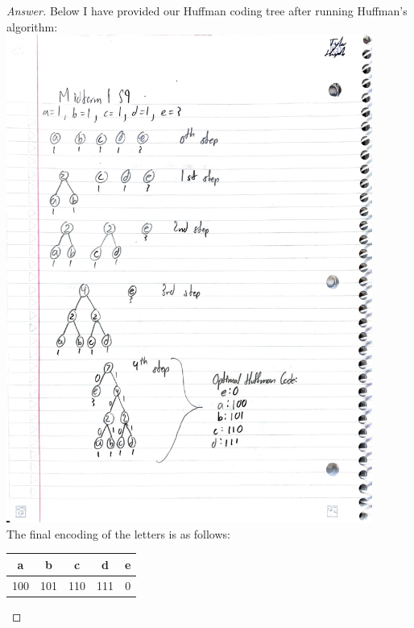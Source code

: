\documentclass[11pt]{article}
\theoremstyle{definition}
\theoremstyle{definition}
\theoremstyle{definition}
\begin{document}
\begin{proof}[Answer]
Below I have provided our Huffman coding tree after running Huffman's algorithm: \\
\includegraphics[width=0.9\textwidth]{Huynh_CSCI3104_M1S9.pdf} \\
The final encoding of the letters is as follows:
\begin{center}
\begin{tabular}{|c|c|c|c|c|} \hline
a & b & c & d & e \\ \hline
100%
 & 101%
 & 110%
 & 111%
 & 0%
 \\ \hline
\end{tabular}
\end{center}

\end{proof}




\end{document}
